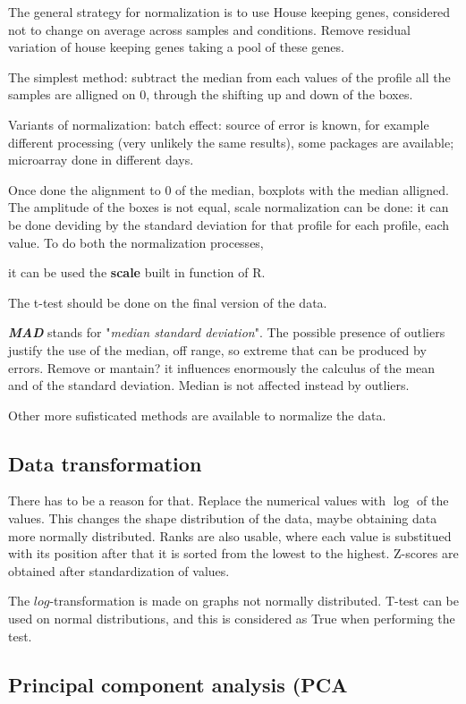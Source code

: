 The general strategy for normalization is to use
House keeping genes,
considered not to change on average across samples and
conditions. Remove residual variation of house keeping genes taking a pool of these genes.

The simplest method: subtract the median from each values of the profile \Rightarrow all the samples are alligned on  $ 0 $, through the shifting up and down of the boxes. 

Variants of normalization: batch effect: source of error is known, for example different processing (very unlikely the same results), some packages are available; microarray done in different days.

Once done the alignment to 0 of the median, boxplots with the median alligned. The amplitude of the boxes is not equal, scale normalization can be done: it can be done deviding by the standard deviation for that profile for each profile, each value. To do both the normalization processes, 

it can be used the \textbf{scale} built in function of R.  

The t-test should be done on the final version of the data. 

\textbf{\textit{MAD}} stands for "\textit{median standard deviation}". The possible presence of outliers justify the use of the median, off range, so extreme that can be produced by errors. Remove or mantain? it influences enormously the calculus of the mean and of the standard deviation. Median is not affected instead by outliers.

Other more sufisticated methods are available to normalize the data. 

\subsection{Data transformation}
There has to be a reason for that.
Replace the numerical values with $ \log $ of the values. This changes the shape distribution of the data, maybe obtaining data more normally distributed. Ranks are also usable, where each value is substitued with its position after that it is sorted from the lowest to the highest.
Z-scores are obtained after standardization of values.

The $ log $-transformation is made on graphs not normally distributed. T-test can be used on normal distributions, and this is considered as True when performing the test.

\subsection{Principal component analysis (PCA}

